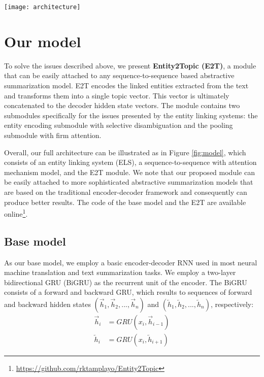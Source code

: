 \documentclass[11pt,a4paper]{article}
\begin{document}
\begin{figure*}[t]
    \centering
    \texttt{[image: architecture]}
    \caption{Full architecture of our proposed sequence-to-sequence model with Entity2Topic (E2T) module.}
    \label{fig:model}
\end{figure*}

\section{Our model}



To solve the issues described above, we present \textbf{Entity2Topic (E2T)}, a module that can be easily attached to any sequence-to-sequence based abstractive summarization model. E2T encodes the linked entities extracted from the text and transforms them into a single topic vector. This vector is ultimately concatenated to the decoder hidden state vectors. The module contains two submodules specifically for the issues presented by the entity linking systems: the entity encoding submodule with selective disambiguation and the pooling submodule with firm attention.

Overall, our full architecture can be illustrated as in Figure \ref{fig:model}, which consists of an entity linking system (ELS), a sequence-to-sequence with attention mechanism model, and the E2T module.
We note that our proposed module can be easily attached to more sophisticated abstractive summarization models \cite{zhou2017selective,tan2017abstractive} that are based on the traditional encoder-decoder framework and consequently can produce better results.
The code of the base model and the E2T are available online\footnote{\url{https://github.com/rktamplayo/Entity2Topic}}.

\subsection{Base model}

As our base model, we employ a basic encoder-decoder RNN used in most neural machine translation \cite{bahdanau2014neural} and text summarization \cite{nallapati2016abstractive} tasks. We employ a two-layer bidirectional GRU (BiGRU) as the recurrent unit of the encoder.
The BiGRU consists of a forward and backward GRU, which results to sequences of forward and backward hidden states $(\overrightarrow{h}_1, \overrightarrow{h}_2, ..., \overrightarrow{h}_n)$ and $(\overleftarrow{h}_1, \overleftarrow{h}_2, ..., \overleftarrow{h}_n)$, respectively:
\begin{align*}
    \overrightarrow{h}_i &= GRU(x_i, \overrightarrow{h}_{i-1}) \\
    \overleftarrow{h}_i &= GRU(x_i, \overleftarrow{h}_{i+1}) \nonumber
\end{align*}
\end{document}
